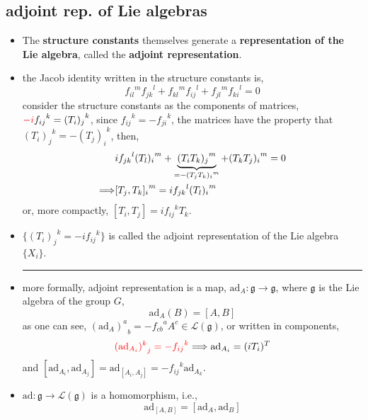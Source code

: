 \subsection{adjoint rep. of Lie algebras}
\begin{itemize}
	\item The \textbf{structure constants} themselves generate a \textbf{representation of the Lie algebra}, called the \textbf{adjoint representation}.
	
	\item the Jacob identity written in the structure constants is,
	\begin{equation}
		{f_{i l}}^m {f_{j k}}^l + {f_{k l}}^m {f_{i j}}^l + {f_{j l}}^m {f_{k i}}^l = 0
	\end{equation}
	consider the structure constants as the components of matrices, $\mathcolor{red}{- i} {f_{i j}}^k = {(T_i)_j}^k$, since ${f_{i j}}^k = - {f_{j i}}^k$, the matrices have the property that ${(T_i)_j}^k = -{(T_j)_i}^k$, then,
	\begin{align}
		& i {f_{j k}}^l {(T_l)_i}^m + \underbrace{{(T_i T_k)_j}^m}_{= - {(T_j T_k)_i}^m} + {(T_k T_j)_i}^m = 0 \notag \\
		\Longrightarrow & {[T_j, T_k]_i}^m = i {f_{j k}}^l {(T_l)_i}^m
	\end{align}
	or, more compactly, $[T_i, T_j] = i {f_{i j}}^k T_k$.
	
	\item $\{{(T_i)_j}^k = - i {f_{i j}}^k\}$ is called the adjoint representation of the Lie algebra $\{X_i\}$.
	
	\noindent\rule[0.5ex]{\linewidth}{0.5pt} %
	
	\item more formally, adjoint representation is a map, $\mathrm{ad}_A : \mathfrak{g} \rightarrow \mathfrak{g}$, where $\mathfrak{g}$ is the Lie algebra of the group $G$,
	\begin{equation}
		\mathrm{ad}_A(B) = [A, B]
	\end{equation}
	as one can see, ${(\mathrm{ad}_A)^a}_b = - {f_{c b}}^a A^c \in \mathcal{L}(\mathfrak{g})$, or written in components,
	\begin{equation}
		\mathcolor{red}{{(\mathrm{ad}_{A_i})^k}_j = - {f_{i j}}^k} \Longrightarrow \mathrm{ad}_{A_i} = (i T_i)^T
	\end{equation}
	and $[\mathrm{ad}_{A_i}, \mathrm{ad}_{A_j}] = \mathrm{ad}_{[A_i, A_j]} = - {f_{i j}}^k \mathrm{ad}_{A_k}$.
	
	\item $\mathrm{ad} : \mathfrak{g} \rightarrow \mathcal{L}(\mathfrak{g})$ is a homomorphism, i.e.,
	\begin{equation}
		\mathrm{ad}_{[A, B]} = [\mathrm{ad}_A, \mathrm{ad}_B]
	\end{equation}
	

\end{itemize}
